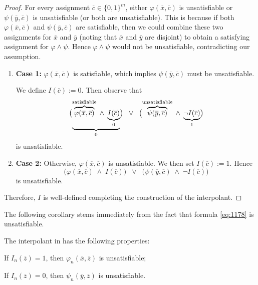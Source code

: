 \begin{proof}
For every assignment \(\overline{c} \in \{0,1\}^m\), either \(\varphi(\overline{x}, \overline{c})\) is unsatisfiable or \(\psi(\overline{y}, \overline{c})\) is unsatisfiable (or both are unsatisfiable). 
This is because if both \(\varphi(\overline{x},\overline{c})\) and \(\psi(\overline{y},\overline{c})\) are satisfiable, then we could combine these two assignments for \(\overline{x}\) and \(\overline{y}\) (noting that \(\overline{x}\) and \(\overline{y}\) are disjoint) to obtain a satisfying assignment for \(\varphi \wedge \psi\). Hence \(\varphi \wedge \psi\) would not be unsatisfiable, contradicting our assumption.

\begin{enumerate}[label=\textbf{(\alph*)}]
    \item \textbf{Case 1:} \(\varphi(\overline{x},\overline{c})\) is satisfiable, which implies \(\psi(\overline{y},\overline{c})\) must be unsatisfiable. 

    We define \( I(\overline{c}) := 0\). Then observe that
    \[
      \bigl(\underbrace{\overbrace{\varphi(\overline{x},\overline{c})}^{\rm satisfiable} \;\land\; \underbrace{I(\overline{c})}_{0}}_0\bigr)
      \;\;\lor\;\;
      \bigl(\overbrace{\psi(\overline{y},\overline{c}) }^{\rm unsatisfiable}\;\land\;\underbrace{\neg I(\overline{c})}_1\bigr)
    \]
    is unsatisfiable. 

    \item \textbf{Case 2:} Otherwise, \(\varphi(\overline{x},\overline{c})\) is unsatisfiable. We then set \(I(\overline{c}) := 1\). Hence
    \[
      \bigl(\varphi(\overline{x},\overline{c}) \;\land\; I(\overline{c})\bigr)
      \;\;\lor\;\;
      \bigl(\psi(\overline{y},\overline{c}) \;\land\;\neg I(\overline{c})\bigr)
    \]
    is unsatisfiable.

\end{enumerate}

\noindent
Therefore, \(I\) is well-defined completing the construction of the interpolant.
\end{proof}

The following corollary stems immediately from the fact that  formula \eqref{eq:1178} is unsatisfiable.
\begin{corollary} \label{cor:simple-interpolation-cor}
The interpolant in  has the following properties:

 If \(I_n(\overline{z}) = 1\), then \(\varphi_n(\overline{x},\overline{z})\) is unsatisfiable;

 If \(I_n(\overline{z}) = 0\), then \(\psi_n(\overline{y},\overline{z})\) is unsatisfiable.
\end{corollary}

